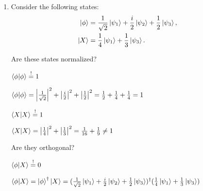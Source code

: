 \documentclass[11pt,a4paper]{scrartcl}
\newcommand{\abs}[1]{\left| #1 \right|}
\begin{document}
\begin{enumerate}
\begin{calculationbox}
            Therefore $a = B = \sum\limits_{m,n} a_{mn} U_{mn}$
        \end{calculationbox}

        or other way of calculation

        \begin{calculationbox}
            Completeness relation $I = \sum\limits_m \ket{\psi_m} \bra{\psi_m}$

            $A 
            = I A I 
            = (\sum\limits_m \ket{\psi_m} \bra{\psi_m})A(\sum\limits_n \ket{\psi_n} \bra{\psi_n}) 
            = \sum\limits_{m,n} \ket{\psi_m} \braket{\psi_m |A | \psi_n} \bra{\psi_n} 
            = \sum\limits_{m,n} \ket{\psi_m} a_{mn} \bra{\psi_n} 
            = \sum\limits_{m,n} a_{mn} \ket{\psi_m | \psi_n} 
            = \sum\limits_{mn} a_{mn} U_{mn}$
        \end{calculationbox}

        \item Consider the following states:
        \begin{align*}
            \ket{\phi} &= \frac{1}{\sqrt{2}} \ket{\psi_1} + \frac{i}{2} \ket{\psi_2} + \frac{1}{2} \ket{\psi_3},\\
            \ket{X} &= \frac{1}{4} \ket{\psi_1} + \frac{1}{3} \ket{\psi_3}. 
        \end{align*}

        Are these states normalized? 
        \begin{calculationbox}
            $\braket{\phi | \phi} \stackrel{!}{=} 1$
            \begin{calculationbox}
                $\braket{\phi | \phi}
                = \abs{\frac{1}{\sqrt{2}}}^2 + \abs{\frac{i}{2}}^2 + \abs{\frac{1}{2}}^2
                = \frac{1}{2} + \frac{1}{4} + \frac{1}{4}
                = 1
                $
            \end{calculationbox}

            $\braket{X | X} \stackrel{!}{=} 1$
            \begin{calculationbox}
                $\braket{X | X}
                = \abs{\frac{1}{4}}^2 + \abs{\frac{1}{3}}^2
                = \frac{1}{16} + \frac{1}{9} \neq 1
                $
            \end{calculationbox}

        \end{calculationbox}

        Are they orthogonal?
        \begin{calculationbox}
            $\braket{\phi | X} \stackrel{!}{=} 0$
            \begin{calculationbox}
                $\braket{\phi | X}
                = \ket{\phi}^\dagger \ket{X}
                = (\frac{1}{\sqrt{2}} \ket{\psi_1} + \frac{i}{2} \ket{\psi_2} + \frac{1}{2} \ket{\psi_3})^\dagger (\frac{1}{4} \ket{\psi_1} + \frac{1}{3} \ket{\psi_3})$


\end{calculationbox}
\end{calculationbox}
\end{enumerate}
\end{document}
